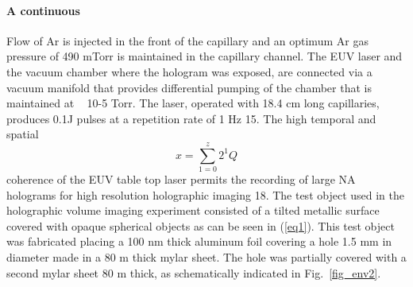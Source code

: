 \documentclass[]{IEEEphot}
\begin{document}
\paragraph{A continuous} Flow of Ar is injected in the front of the capillary and an optimum Ar gas pressure of 490 mTorr is maintained in the capillary channel. The EUV laser and the vacuum chamber where the hologram was exposed, are connected via a vacuum manifold that provides differential pumping of the chamber that is maintained at ~ 10-5 Torr. The laser, operated with 18.4 cm long capillaries, produces 0.1J pulses at a repetition rate of 1 Hz 15. The high temporal and spatial  
\begin{equation}
x=\sum\limits_{1=0}^z 2^1Q
\label{eq1}
\end{equation}%
coherence of the EUV table top laser permits the recording of large NA holograms for high resolution holographic imaging 18. The test object used in the holographic volume imaging experiment consisted of a tilted metallic surface covered with opaque spherical objects as can be seen in (\ref{eq1}). This test object was fabricated placing a 100 nm thick aluminum foil covering a hole 1.5 mm in diameter made in a 80 m thick mylar sheet. The hole was partially covered with a second mylar sheet 80 m thick, as schematically indicated in Fig.~\ref{fig_env2}.
\end{document}
